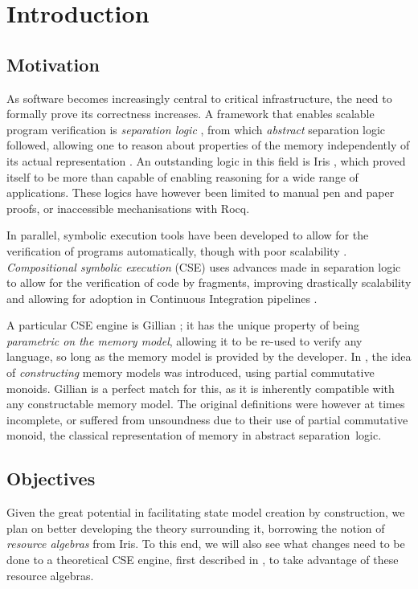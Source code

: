\chapter{Introduction}

\section{Motivation}

As software becomes increasingly central to critical infrastructure, the need to formally prove its correctness increases. A framework that enables scalable program verification is \emph{separation logic} \cite{seplogic1,seplogic2}, from which \emph{abstract} separation logic followed, allowing one to reason about properties of the memory independently of its actual representation \cite{higherorderseplogic,abstractseplogic}. An outstanding logic in this field is Iris \cite{iris}, which proved itself to be more than capable of enabling reasoning for a wide range of applications. These logics have however been limited to manual pen and paper proofs, or inaccessible mechanisations with Rocq.

In parallel, symbolic execution tools have been developed to allow for the verification of programs automatically, though with poor scalability \cite{surveysymex}. \emph{Compositional symbolic execution} (CSE) uses advances made in separation logic to allow for the verification of code by fragments, improving drastically scalability \cite{pathexplo} and allowing for adoption in Continuous Integration pipelines \cite{pulse}.

A particular CSE engine is Gillian \cite{gillian0}; it has the unique property of being \emph{parametric on the memory model}, allowing it to be re-used to verify any language, so long as the memory model is provided by the developer. In \cite{sacha-phd}, the idea of \emph{constructing} memory models was introduced, using partial commutative monoids. Gillian is a perfect match for this, as it is inherently compatible with any constructable memory model. The original definitions were however at times incomplete, or suffered from unsoundness due to their use of partial commutative monoid, the classical representation of memory in abstract separation~logic.

\section{Objectives}

Given the great potential in facilitating state model creation by construction, we plan on better developing the theory surrounding it, borrowing the notion of \emph{resource algebras} from Iris. To this end, we will also see what changes need to be done to a theoretical CSE engine, first described in \cite{cse1,cse2}, to take advantage of these resource algebras.

